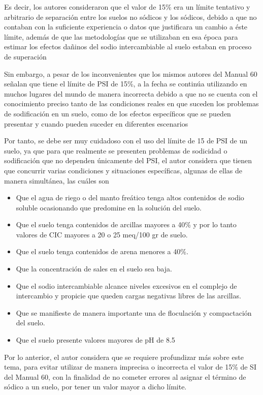 Es decir, los autores consideraron que el valor de 15\% era un límite tentativo y arbitrario de separación entre los suelos no sódicos y los sódicos, debido a que no contaban con la suficiente experiencia o datos que justificara un cambio a éste límite, además de que las metodologías que se utilizaban en esa época para estimar los efectos dañinos del sodio intercambiable al suelo estaban en proceso de superación

Sin embargo, a pesar de los inconvenientes que los mismos autores del Manual 60 señalan que tiene el límite de PSI de 15\%, a la fecha se continúa utilizando en muchos lugares del mundo de manera incorrecta debido a que no se cuenta con el conocimiento preciso tanto de las condiciones reales en que suceden los problemas de sodificación en un suelo, como de los efectos específicos que se pueden presentar y cuando pueden suceder en diferentes escenarios

Por tanto, se debe ser muy cuidadoso con el uso del límite de 15 de PSI de un suelo, ya que para que realmente se presenten problemas de sodicidad o sodificación que no dependen únicamente del PSI, el autor considera que tienen que concurrir varias condiciones y situaciones específicas, algunas de ellas de manera simultánea, las cuáles son

\begin{itemize}
\item Que el agua de riego o del manto freático tenga altos contenidos de sodio soluble ocasionando que predomine en la solución del suelo.
\item Que el suelo tenga contenidos de arcillas mayores a 40\% y por lo tanto valores de CIC mayores a 20 o 25 meq/100 gr de suelo.
\item Que el suelo tenga contenidos de arena menores a 40\%.
\item Que la concentración de sales en el suelo sea baja.
\item Que el sodio intercambiable alcance niveles excesivos en el complejo de intercambio y propicie que queden cargas negativas libres de las arcillas.
\item Que se manifieste de manera importante una de floculación y compactación del suelo.
\item Que el suelo presente valores mayores de pH de 8.5
\end{itemize}
Por lo anterior, el autor considera que se requiere profundizar más sobre este tema, para evitar utilizar de manera imprecisa o incorrecta el valor de 15\% de SI del Manual 60, con la finalidad de no cometer errores al asignar el término de sódico a un suelo, por tener un valor mayor a dicho límite.

